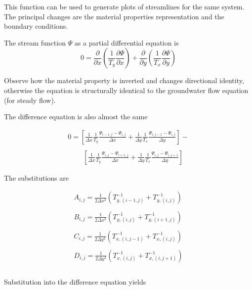 This function can be used to generate plots of streamlines for the same system.
The principal changes are the material properties representation and the boundary conditions.  

The stream function $\Psi$ as a partial differential equation is
\begin{equation}
0= 
\frac{\partial}{\partial x}({\frac{1}{T_y} \frac{\partial \Psi}{\partial x}})
+
\frac{\partial}{\partial y}({\frac{1}{T_x} \frac{\partial \Psi}{\partial y}})
\end{equation}

Observe how the material property is inverted and changes directional identity, otherwise the equation is structurally identical to the groundwater flow equation (for steady flow).

The difference equation is also almost the same

\begin{equation}
\begin{matrix}
0= 
[\frac{1}{\Delta x} \frac{1}{T_{y}} \frac{\Psi_{i-1,j} - \Psi_{i,j}}{\Delta x} +
 \frac{1}{\Delta y} \frac{1}{T_{x}} \frac{\Psi_{i,j-1} - \Psi_{i,j}}{\Delta y}] - \\
~~~~~~~~~~\\
~~~~~~~~~~[ \frac{1}{\Delta x} \frac{1}{T_{y}}  \frac{\Psi_{i,j} - \Psi_{i+1,j}}{\Delta x} +
  \frac{1}{\Delta y}  \frac{1}{T_{x}} \frac{\Psi_{i,j} - \Psi_{i,j+1}}{\Delta y} ]        
\end{matrix}        
\end{equation}

The substitutions are

\begin{equation}
\begin{matrix}
A_{i,j} = \frac{1}{2 \Delta x^2}(T_{y,(i-1,j)}^{-1}+T_{y,(i,j)}^{-1}) \\ ~~ \\
B_{i,j} = \frac{1}{2 \Delta x^2}(T_{y,(i,j)}^{-1}+T_{y,(i+1,j)}^{-1})   \\ ~~ \\
C_{i,j} = \frac{1}{2 \Delta y^2}(T_{x,(i,j-1)}^{-1}+T_{x,(i,j)}^{-1})   \\ ~~ \\
D_{i,j} = \frac{1}{2 \Delta y^2}(T_{x,(i,j)}^{-1}+T_{x,(i,j+1)}^{-1})   \\ ~~ \\
\end{matrix}
\end{equation}

Substitution into the difference equation yields

